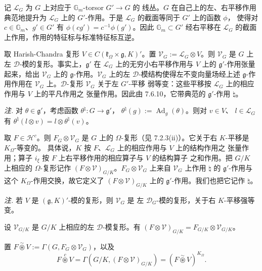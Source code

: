 记 $\mathcal{L}_G$ 为 $G$ 上对应于 $\mathbb{G}_m$-torsor $G'\to G$ 的
线丛。$G$ 在自己上的左、右平移作用典范地提升为 $\mathcal{L}_G$ 上的
$G'$-作用。于是 $\mathcal{L}_G$ 的截面等同于 $G'$ 上的函数 $\phi$，
使得对 $c\in\mathbb{G}_m$、$g'\in G'$ 有
$\phi(cg')=c^{-1}\phi(g')$。因此 $\mathbb{G}_m\subset G'$ 经右平移在
$\mathcal{L}_G$ 的截面上作用，作用的特征标与标准特征标互逆。

取 Harish-Chandra 复形
$V\in C(\mathfrak{k}_\Omega\times\mathfrak{g},K)'$。置
$\mathcal{V}_G:=\mathcal{L}_G\otimes V$。则 $\mathcal{V}_G$ 是 $G$ 上
左 $\mathcal{D}$-模的复形。事实上，$\mathfrak{g}'$ 在 $\mathcal{L}_G$
上的无穷小右平移作用与 $V$ 上的 $\mathfrak{g}'$-作用张量起来，给出
$\mathcal{V}_G$ 上的 $\mathfrak{g}$-作用。$\mathcal{V}_G$ 上的左
$\mathcal{D}$-模结构使得左不变向量场经上述 $\mathfrak{g}$-作用作用在
$\mathcal{V}_G$ 上。$\mathcal{D}$-复形 $\mathcal{V}_G$ 关于左 $G'$-平移
弱等变：这些平移按 $\mathcal{L}_G$ 上的相应作用与 $V$ 上的平凡作用之
张量作用。因此由 7.6.10，它带典范的 $\mathfrak{g}'$-作用 $\natural$。

\emph{注.} 对 $\theta\in\mathfrak{g}'$，考虑函数
$\theta^{\natural}:G\to\mathfrak{g}'$，
$\theta^{\natural}(g):=\operatorname{Ad}_g(\theta)$。则对 $v\in V$、
$l\in\mathcal{L}_G$ 有
$\theta^{\natural}(l\otimes v)=l\otimes\theta^{\natural}(v)$。

取 $F\in\mathcal{H}^c$。则 $F_G\otimes\mathcal{V}_G$ 是 $G$ 上的
$\Omega$-复形（见 7.2.3(ii)）。它关于右 $K$-平移是 $K_\Omega$-等变的。
具体说，$K$ 按 $F$、$\mathcal{L}_G$ 上的相应作用与 $V$ 上的结构作用之
张量作用；算子 $i_\xi$ 按 $F$ 上右平移作用的相应算子与 $V$ 的结构算子
之和作用。把 $G/K$ 上相应的 $\Omega$-复形记作
$(F\otimes\mathcal{V})_{G/K}$。$F_G\otimes\mathcal{V}_G$ 上来自
$\mathcal{V}_G$ 上作用 $\natural$ 的 $\mathfrak{g}'$-作用与这个
$K_\Omega$-作用交换，故它定义了 $(F\otimes\mathcal{V})_{G/K}$ 上的
$\mathfrak{g}'$-作用。我们也把它记作 $\natural$。

\emph{注.} 若 $V$ 是 $(\mathfrak{g},K)'$-模的复形，则 $\mathcal{V}_G$ 是
左 $\mathcal{D}_G$-模的复形，关于右 $K$-平移强等变。


设 $\mathcal{V}_{G/K}$ 是 $G/K$ 上相应的左 $\mathcal{D}$-模复形。有
$(F\otimes\mathcal{V})_{G/K}=F_{G/K}\otimes\mathcal{V}_{G/K}$。

置 $F\overset{\sim}{\circledast}V:=
\Gamma(G,F_G\otimes\mathcal{V}_G)$，以及
\begin{equation}\tag{331}
F\overset{c}{\circledast}V=\Gamma(G/K,(F\otimes\mathcal{V})_{G/K})
=(F\overset{\sim}{\circledast}V)^{K_\Omega}.
\end{equation}

